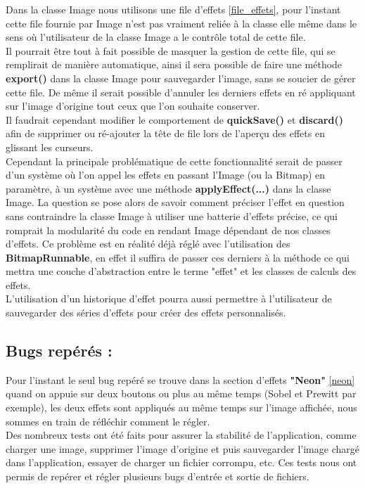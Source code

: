 Dans la classe Image nous utilisons une file d'effets \ref{file_effets}, pour l'instant cette file fournie par Image n'est pas vraiment reliée à la classe elle même dans le sens où l'utilisateur de la classe Image a le contrôle total de cette file.
\\
Il pourrait être tout à fait possible de masquer la gestion de cette file, qui se remplirait de manière automatique, ainsi il sera possible de faire une méthode \textbf{export()} dans la classe Image pour sauvegarder l'image, sans se soucier de gérer cette file. De même il serait possible d'annuler les derniers effets en ré appliquant sur l'image d'origine tout ceux que l'on souhaite conserver.
\\
Il faudrait cependant modifier le comportement de \textbf{quickSave()} et \textbf{discard()} afin de supprimer ou ré-ajouter la tête de file lors de l'aperçu des effets en glissant les curseurs.
\\
Cependant la principale problématique de cette fonctionnalité serait de passer d'un système où l'on appel les effets en passant l'Image (ou la Bitmap) en paramètre, à un système avec une méthode \textbf{applyEffect(...)} dans la classe Image. La question se pose alors de savoir comment préciser l'effet en question sans contraindre la classe Image à utiliser une batterie d'effets précise, ce qui romprait la modularité du code en rendant Image dépendant de nos classes d'effets. Ce problème est en réalité déjà réglé avec l'utilisation des \textbf{BitmapRunnable}, en effet il suffira de passer ces derniers à la méthode ce qui mettra une couche d'abstraction entre le terme "effet" et les classes de calculs des effets.
\\

L'utilisation d'un historique d'effet pourra aussi permettre à l'utilisateur de sauvegarder des séries d'effets pour créer des effets personnalisés.

\subsection{Bugs repérés :}
Pour l'instant le seul bug repéré se trouve dans la section d'effets \textbf{"Neon"} \ref{neon} quand on appuie sur deux boutons ou plus au même temps (Sobel et Prewitt par exemple), les deux effets sont appliqués au même temps sur l'image affichée, nous sommes en train de réfléchir comment le régler.
\\
Des nombreux tests ont été faits pour assurer la stabilité de l'application, comme charger une image, supprimer l'image d'origine et puis sauvegarder l'image chargé dans l'application, essayer de charger un fichier corrompu, etc. Ces tests nous ont permis de repérer et régler plusieurs bugs d'entrée et sortie de fichiers.

